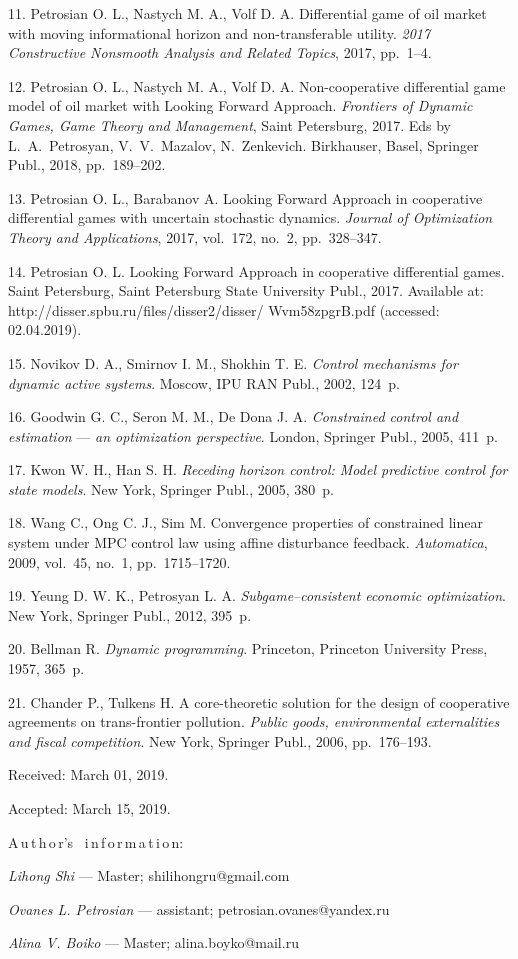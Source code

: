 {11. Petrosian O. L., Nastych M. A., Volf D. A. Differential game
of oil market with moving informational horizon and
non-transferable utility. {\it 2017 Constructive Nonsmooth
Analysis and Related Topics}, 2017, pp.~1--4.

12. Petrosian O. L., Nastych M. A., Volf D. A. Non-cooperative
differential game model of oil market with Looking Forward
Approach. {\it Frontiers of Dynamic Games, Game Theory and
Management}, Saint Petersburg, 2017. Eds by L.~A.~Petrosyan,
V.~V.~Mazalov, N.~Zenkevich. Birkhauser, Basel, Springer Publ.,
2018, pp.~189--202.

13. Petrosian O. L., Barabanov A. Looking Forward Approach in
cooperative differential games with uncertain stochastic dynamics.
{\it Journal of Optimization Theory and Applications}, 2017,
vol.~172, no.~2, pp.~328--347.

14. Petrosian O. L. Looking Forward Approach in cooperative
differential games. Saint Petersburg, Saint Petersburg State
University Publ., 2017. Available at:
http://disser.spbu.ru/files/disser2/disser/ Wvm58zpgrB.pdf
(accessed: 02.04.2019).

15. Novikov D. A., Smirnov I. M., Shokhin T. E. {\it Control
mechanisms for dynamic active systems}. Moscow, IPU RAN Publ.,
2002, 124~p.

16. Goodwin G. C., Seron M. M., De Dona J. A. {\it Constrained
control and estimation} --- {\it an optimization perspective}.
London, Springer Publ., 2005, 411~p.

17. Kwon W. H., Han S. H. {\it Receding horizon control: Model
predictive control for state models}. New York, Springer Publ.,
2005, 380~p.

18. Wang C., Ong C. J., Sim M. Convergence properties of
constrained linear system under MPC control law using affine
disturbance feedback. {\it Automatica}, 2009, vol.~45, no.~1,
pp.~1715--1720.

19. Yeung D. W. K., Petrosyan L. A. {\it Subgame--consistent
economic optimization}. New York, Springer Publ., 2012, 395~p.

20. Bellman R. {\it Dynamic programming}. Princeton, Princeton
University Press, 1957, 365~p.

21. Chander P., Tulkens H. A core-theoretic solution for the
design of cooperative agreements on trans-frontier pollution. {\it
Public goods, environmental externalities and fiscal competition}.
New York, Springer Publ., 2006, pp.~176--193.


\vskip 1.5mm

%

Received:  March 01, 2019.

Accepted: March 15, 2019.

\vskip6mm A\,u\,t\,h\,o\,r's \ i\,n\,f\,o\,r\,m\,a\,t\,i\,o\,n:

\vskip1.5mm\textit{Lihong Shi} --- Master; shilihongru@gmail.com

\vskip1.5mm\textit{Ovanes L. Petrosian} --- assistant;
petrosian.ovanes@yandex.ru

\vskip1.5mm\textit{Alina V. Boiko} --- Master; alina.boyko@mail.ru

}
